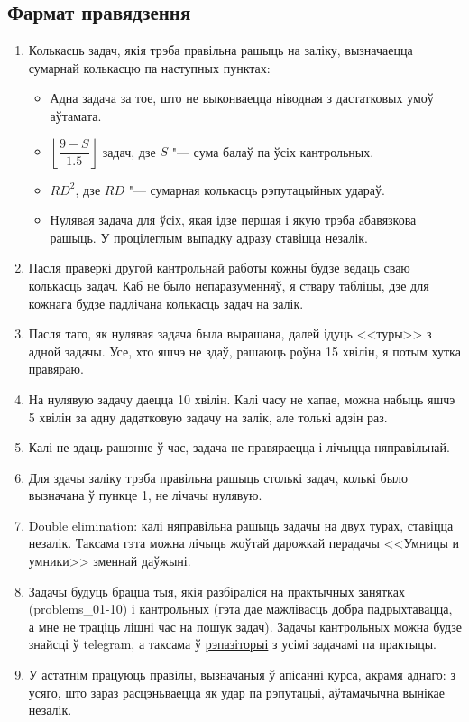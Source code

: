 \documentclass[12pt, a4paper]{extarticle}
\begin{document}
    \subsection{Фармат правядзення}
    \begin{enumerate}
        \item Колькасць задач, якія трэба правільна рашыць на заліку, вызначаецца сумарнай колькасцю па наступных пунктах:
        \begin{itemize}
            \item Адна задача за тое, што не выконваецца ніводная з дастатковых умоў аўтамата.
            \item $\left\lfloor \dfrac{9 - S}{1.5} \right\rfloor$ задач, дзе $S$ "--- сума балаў па ўсіх кантрольных.
            \item $RD^2$, дзе $RD$ "--- сумарная колькасць рэпутацыйных удараў.
            \item Нулявая задача для ўсіх, якая ідзе першая і якую трэба абавязкова рашыць. У процілеглым выпадку адразу ставіцца незалік.
        \end{itemize}
        \item Пасля праверкі другой кантрольнай работы кожны будзе ведаць сваю колькасць задач. Каб не было непаразуменняў, я ствару табліцы, дзе для кожнага будзе падлічана колькасць задач на залік.
        \item Пасля таго, як нулявая задача была вырашана, далей ідуць <<туры>> з адной задачы. Усе, хто яшчэ не здаў, рашаюць роўна 15 хвілін, я потым хутка правяраю. 
        \item На нулявую задачу даецца 10 хвілін. Калі часу не хапае, можна набыць яшчэ 5 хвілін за адну дадатковую задачу на залік, але толькі адзін раз.
        \item Калі не здаць рашэнне ў час, задача не правяраецца і лічыцца няправільнай. 
        \item Для здачы заліку трэба правільна рашыць столькі задач, колькі было вызначана ў пункце 1, не лічачы нулявую.
        \item Double elimination: калі няправільна рашыць задачы на двух турах, ставіцца незалік. Таксама гэта можна лічыць жоўтай дарожкай перадачы <<Умницы и умники>> зменнай даўжыні.
        \item Задачы будуць брацца тыя, якія разбіраліся на практычных занятках (problems\_01-10) і кантрольных (гэта дае мажлівасць добра падрыхтавацца, а мне не траціць лішні час на пошук задач). Задачы кантрольных можна будзе знайсці ў telegram, а таксама ў \href{https://github.com/bsu-docs/discrete-mathematics-problems}{рэпазіторыі} з усімі задачамі па практыцы.
        \item У астатнім працуюць правілы, вызначаныя ў апісанні курса, акрамя аднаго: з усяго, што зараз расцэньваецца як удар па рэпутацыі, аўтамачычна вынікае незалік.
    \end{enumerate}
\end{document}
